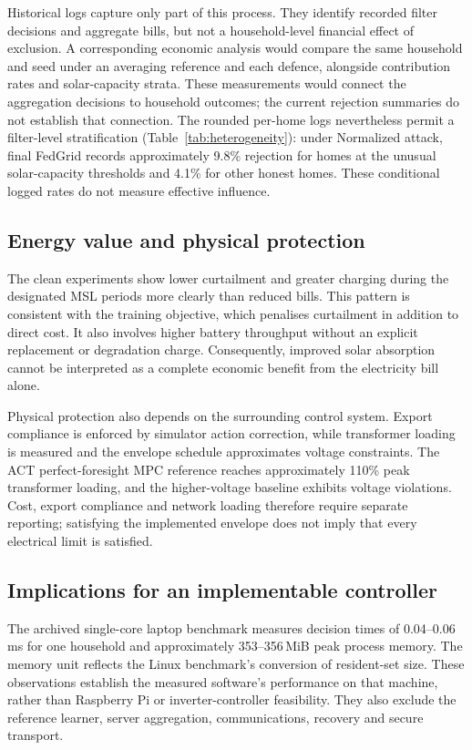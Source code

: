 \documentclass[preprint,12pt,a4paper]{elsarticle}
\begin{document}
Historical logs capture only part of this process. They identify recorded filter decisions and aggregate bills, but not a household-level financial effect of exclusion. A corresponding economic analysis would compare the same household and seed under an averaging reference and each defence, alongside contribution rates and solar-capacity strata. These measurements would connect the aggregation decisions to household outcomes; the current rejection summaries do not establish that connection. The rounded per-home logs nevertheless permit a filter-level stratification (Table~\ref{tab:heterogeneity}): under Normalized attack, final FedGrid records approximately 9.8\% rejection for homes at the unusual solar-capacity thresholds and 4.1\% for other honest homes. These conditional logged rates do not measure effective influence.

\subsection{Energy value and physical protection}
The clean experiments show lower curtailment and greater charging during the designated MSL periods more clearly than reduced bills. This pattern is consistent with the training objective, which penalises curtailment in addition to direct cost. It also involves higher battery throughput without an explicit replacement or degradation charge. Consequently, improved solar absorption cannot be interpreted as a complete economic benefit from the electricity bill alone.

Physical protection also depends on the surrounding control system. Export compliance is enforced by simulator action correction, while transformer loading is measured and the envelope schedule approximates voltage constraints. The ACT perfect-foresight MPC reference reaches approximately 110\% peak transformer loading, and the higher-voltage baseline exhibits voltage violations. Cost, export compliance and network loading therefore require separate reporting; satisfying the implemented envelope does not imply that every electrical limit is satisfied.

\subsection{Implications for an implementable controller}
The archived single-core laptop benchmark measures decision times of 0.04--0.06\,ms for one household and approximately 353--356\,MiB peak process memory. The memory unit reflects the Linux benchmark's conversion of resident-set size. These observations establish the measured software's performance on that machine, rather than Raspberry Pi or inverter-controller feasibility. They also exclude the reference learner, server aggregation, communications, recovery and secure transport.
\end{document}
